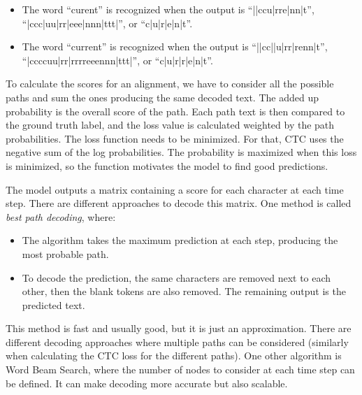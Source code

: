 \begin{itemize}
\item The word ``curent'' is recognized when the output is ``||ccu|rre|nn|t'', ``|ccc|uu|rr|eee|nnn|ttt|'', or ``c|u|r|e|n|t''.
\item The word ``current'' is recognized when the output is ``||cc||u|rr|renn|t'', ``|ccccuu|rr|rrrreeennn|ttt|'', or ``c|u|r|r|e|n|t''.
\end{itemize}

To calculate the scores for an alignment, we have to consider all the possible paths and sum the ones producing the same decoded text. The added up probability is the overall score of the path. Each path text is then compared to the ground truth label, and the loss value is calculated weighted by the path probabilities. The loss function needs to be minimized. For that, CTC uses the negative sum of the log probabilities. The probability is maximized when this loss is minimized, so the function motivates the model to find good predictions.

The model outputs a matrix containing a score for each character at each time step. There are different approaches to decode this matrix. One method is called \textit{best path decoding}, where:

\begin{itemize}
\item The algorithm takes the maximum prediction at each step, producing the most probable path.
\item To decode the prediction, the same characters are removed next to each other, then the blank tokens are also removed. The remaining output is the predicted text.
\end{itemize}

This method is fast and usually good, but it is just an approximation. There are different decoding approaches where multiple paths can be considered (similarly when calculating the CTC loss for the different paths). One other algorithm is Word Beam Search\cite{WordBeamSearch}, where the number of nodes to consider at each time step can be defined. It can make decoding more accurate but also scalable.